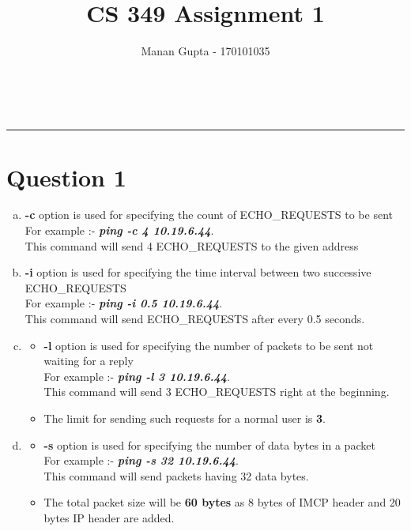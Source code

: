 \documentclass[a4paper,10pt]{article}
\title{CS 349 Assignment 1}
\author{Manan Gupta - 170101035}
\makeatletter
\renewcommand\maketitle{
	{\raggedright {
			\color{RoyalPurple}
		\begin{center}
			{\fontsize{22pt}{22pt} \bfseries \sffamily \@title } \qquad\qquad
			{\fontsize{22pt}{22pt} \bfseries \@author}\\[8ex]
\end{center}}} }
\makeatother
\begin{document}
\maketitle
\vspace{-1cm}
\hrule

\section*{Question 1}
\begin{enumerate}[a)]
	\item \textbf{-c} option is used for specifying the count of ECHO\_REQUESTS to be sent
	\\
	For example :- \textit{\textbf{ping -c 4 10.19.6.44}}. \\
	This command will send 4 ECHO\_REQUESTS to the given address
	\vspace{-0.1cm}\item \textbf{-i} option is used for specifying the time interval between two successive ECHO\_REQUESTS
	\\
	For example :- \textit{\textbf{ping -i 0.5 10.19.6.44}}. \\
	This command will send ECHO\_REQUESTS after every 0.5 seconds.
	\vspace{-0.1cm}\item
	\begin{itemize}
		\item  \textbf{-l} option is used for specifying the number of packets to be sent not waiting for a reply\\
		For example :- \textit{\textbf{ping -l 3 10.19.6.44}}. \\
		This command will send 3 ECHO\_REQUESTS right at the beginning.
		\vspace{-0.1cm}\item The limit for sending such requests for a normal user is \textbf{3}.
	\end{itemize}
	\vspace{-0.1cm}\item
	\begin{itemize}
		\item  \textbf{-s} option is used for specifying the number of data bytes in a packet\\
		For example :- \textit{\textbf{ping -s 32 10.19.6.44}}. \\
		This command will send packets having 32 data bytes.
		\vspace{-0.1cm}\item The total packet size will be \textbf{60 bytes} as 8 bytes of IMCP header and 20 bytes IP header are added.
	\end{itemize}
\end{enumerate}
\end{document}
